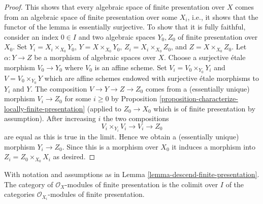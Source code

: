 \begin{proof}
\medskip\noindent
This shows that every algebraic space of finite presentation over $X$ comes
from an algebraic space of finite presentation over some $X_i$, i.e.,
it shows that the functor of the lemma is essentially surjective. To
show that it is fully faithful, consider an index $0 \in I$ and two
algebraic spaces $Y_0, Z_0$ of finite presentation over $X_0$.
Set $Y_i = X_i \times_{X_0} Y_0$, $Y = X \times_{X_0} Y_0$,
$Z_i = X_i \times_{X_0} Z_0$, and $Z = X \times_{X_0} Z_0$. Let
$\alpha : Y \to Z$ be a morphism of algebraic spaces over $X$.
Choose a surjective \'etale morphism $V_0 \to Y_0$ where $V_0$ is
an affine scheme. Set $V_i = V_0 \times_{Y_0} Y_i$ and
$V = V_0 \times_{Y_0} Y$ which are affine schemes endowed with
surjective \'etale morphisms to $Y_i$ and $Y$. The composition
$V \to Y \to Z \to Z_0$ comes from a (essentially unique) morphism
$V_i \to Z_0$ for some $i \geq 0$ by
Proposition \ref{proposition-characterize-locally-finite-presentation}
(applied to $Z_0 \to X_0$ which is of finite presentation by assumption).
After increasing $i$ the two compositions
$$
V_i \times_{Y_i} V_i \to V_i \to Z_0
$$
are equal as this is true in the limit. Hence we obtain a (essentially unique)
morphism $Y_i \to Z_0$. Since this is a morphism over $X_0$
it induces a morphism into $Z_i = Z_0 \times_{X_0} X_i$ as desired.
\end{proof}

\begin{lemma}
\label{lemma-descend-modules-finite-presentation}
With notation and assumptions as in
Lemma \ref{lemma-descend-finite-presentation}.
The category of $\mathcal{O}_X$-modules of finite presentation is the
colimit over $I$ of the categories $\mathcal{O}_{X_i}$-modules of finite
presentation.
\end{lemma}

